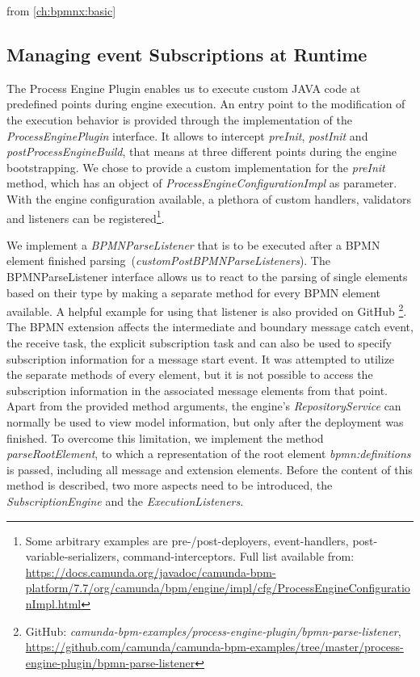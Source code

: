 

from \autoref{ch:bpmnx:basic}

\subsection{Managing event Subscriptions at Runtime}
The Process Engine Plugin enables us to execute custom JAVA code at predefined points during engine execution.
An entry point to the modification of the execution behavior is provided through the implementation of the \textit{ProcessEnginePlugin} interface. It allows to intercept \textit{preInit}, \textit{postInit} and \textit{postProcessEngineBuild}, that means at three different points during the engine bootstrapping.
We chose to provide a custom implementation for the \textit{preInit} method, which has an object of \textit{ProcessEngineConfigurationImpl} as parameter.
With the engine configuration available, a plethora of custom handlers, validators and listeners can be registered\footnote{Some arbitrary examples are pre-/post-deployers, event-handlers, post-variable-serializers, command-interceptors. Full list available from: \url{https://docs.camunda.org/javadoc/camunda-bpm-platform/7.7/org/camunda/bpm/engine/impl/cfg/ProcessEngineConfigurationImpl.html}}.

We implement a \textit{BPMNParseListener} that is to be executed after a BPMN element finished parsing~(\textit{customPostBPMNParseListeners}).
The BPMNParseListener interface allows us to react to the parsing of single elements based on their type by making a separate method for every BPMN element available.
A helpful example for using that listener is also provided on GitHub
\footnote{GitHub: \textit{camunda-bpm-examples/process-engine-plugin/bpmn-parse-listener}, \url{https://github.com/camunda/camunda-bpm-examples/tree/master/process-engine-plugin/bpmn-parse-listener}}.
The BPMN extension affects the intermediate and boundary message catch event, the receive task, the explicit subscription task and can also be used to specify subscription information for a message start event.
It was attempted to utilize the separate methods of every element, but it is not possible to access the subscription information in the associated message elements from that point. Apart from the provided method arguments, the engine's \textit{RepositoryService} can normally be used to view model information, but only after the deployment was finished.  
To overcome this limitation, we implement the method \textit{parseRootElement}, to which a representation of the root element \textit{bpmn:definitions} is passed, including all message and extension elements. 
Before the content of this method is described, two more aspects need to be introduced, the \textit{SubscriptionEngine} and the \textit{ExecutionListeners}.

